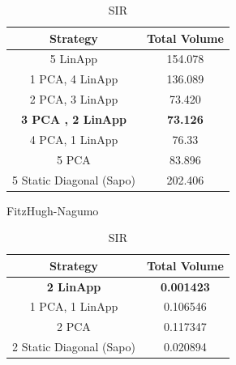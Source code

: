 \begin{table}[h!]
  \hspace{1em}
  \begin{subtable}[h]{0.45\textwidth}
       \centering
       \begin{tabular}{|c|c|}
       \hline
       Strategy & Total  Volume \\
       \hline
       5 LinApp  & 154.078\\
       \hline
       1 PCA, 4 LinApp  & 136.089\\
       \hline
       2 PCA, 3 LinApp  & 73.420\\
       \hline
       {\bf 3 PCA , 2 LinApp } & {\bf 73.126} \\
       \hline
       4 PCA, 1 LinApp  & 76.33 \\
       \hline
       5 PCA & 83.896 \\
       \hline
       5 Static Diagonal  (Sapo) & 202.406  \\
       \hline
      \end{tabular}
      \caption{FitzHugh-Nagumo}
      \end{subtable} \hspace{1em}
      \begin{subtable}[h]{0.45\textwidth}
        \centering
        \begin{tabular}{|c|c|}
        \hline
        Strategy & Total  Volume \\
        \hline
        {\bf 2 LinApp } & {\bf 0.001423} \\
        \hline
        1 PCA, 1 LinApp & 0.106546\\

        \hline
        2 PCA  & 0.117347\\
        \hline
        2 Static Diagonal (Sapo) & 0.020894\\
        \hline
       \end{tabular}
       \caption{SIR}
       \label{tab:sirvol}
    \end{subtable}


\end{table}
